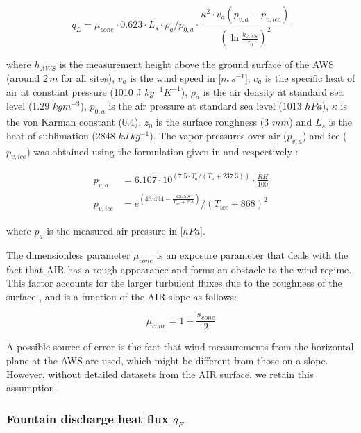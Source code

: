 \documentclass[utf8]{frontiersSCNS}
\begin{document}
\begin{equation}
	q_{L}=\mu_{cone}\cdot 0.623 \cdot L_s \cdot \rho_{a}/p_{0,a} \cdot \frac{\kappa^2 \cdot
	v_a(p_{v,a}-p_{v,ice})}{{(\ln{\frac{h_{AWS}}{z_{0}}})}^2}
\end{equation}

where $h_{AWS}$ is the measurement height above the ground surface of the AWS (around $2\,m$ for all sites),
$v_a$ is the wind speed in [$m\,s^{-1}$], $c_a$ is the specific heat of air at constant pressure (1010 J
$kg^{-1} K^{-1}$), $\rho_{a}$ is the air density at standard sea level (1.29 $kg m^{-3}$), $p_{0,a}$ is the air
pressure at standard sea level (1013 $hPa$), $\kappa$ is the von Karman constant (0.4), $z_{0}$ is the surface
roughness (3 $mm$) and $L_s$ is the heat of sublimation (2848 $kJ\,kg^{-1}$).  The vapor pressures over air
($p_{v,a}$) and ice ($p_{v,ice}$) was obtained using the formulation given in \cite{WMO_2018} and
\cite{huang_2018} respectively  :

\begin{equation}
	\begin{split}
		p_{v,a}&=6.107 \cdot 10^{(7.5 \cdot T_a / (T_a + 237.3))} \cdot \frac{RH}{100}\\
		p_{v,ice}&=e^{(43.494 - \frac{6545.8}{T_{ice} + 278})}/(T_{ice} + 868)^2
	\end{split} \label{eqn:vp}
\end{equation}

where $p_{a}$ is the measured air pressure in [$hPa$].

The dimensionless parameter $\mu_{cone}$ is an exposure parameter that deals with the fact that AIR has a rough
appearance and forms an obstacle to the wind regime. This factor accounts for the larger turbulent fluxes due to
the roughness of the surface \citep{Oerlemans_2021}, and is a function of the AIR slope as follows:

\begin{equation}
	\mu_{cone} = 1 + \frac{s_{cone}}{2}
\end{equation}

A possible source of error is the fact that wind measurements from the horizontal plane at the AWS are used,
which might be different from those on a slope. However, without detailed datasets from the AIR surface, we
retain this assumption.

\subsubsection{Fountain discharge heat flux \texorpdfstring{$q_{F}$}{Lg} }
\end{document}
